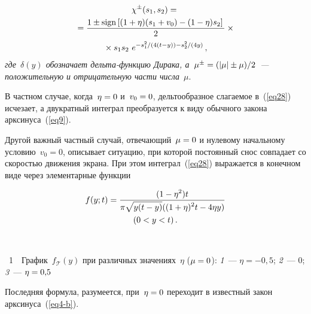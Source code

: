 \begin{multicols}{2}
\vspace*{-12pt}

\noindent
\begin{multline}
     \chi^\pm(s_1, s_2) ={}\\
      {}=\displaystyle\frac{\displaystyle 1 \pm \mathrm{sign}\left[(1 + \eta)(s_1+v_0)-(1 - \eta )s_2\right]\mathstrut}{\displaystyle 2\mathstrut}\times{}\\
      {}\times s_1 s_2\ e^{- {s_1^2}/(4(t-y)) -{s_2^2}/(4y)}\,,
    \label{eq28}
  \end{multline}
  \textit{где~$\delta(y)$ обозначает дель\-та-функ\-цию Дирака, а~$\mu^\pm \hm= (|\mu| \pm \mu)/2$~--- положительную и отрицательную части числа}~$\mu$.


\smallskip

В частном случае, когда~$\eta \hm= 0$ и~$v_0 \hm= 0$, дельтообразное слагаемое в~(\ref{eq28}) исчезает, а двукратный интеграл преобразуется к виду обычного закона арксинуса~(\ref{eq9}).

Другой важный частный случай, от\-ве\-ча\-ющий~$\mu \hm= 0$ и нулевому начальному условию~$v_0 = 0$, описывает ситуацию, при которой постоянный снос совпадает со скоростью движения экрана. При этом интеграл~(\ref{eq28}) выражается в конечном виде через элементарные функции

\noindent
\begin{multline*}
  f(y; t) = \displaystyle\frac{\displaystyle (1 - \eta ^2)t\mathstrut}{\displaystyle \pi  \sqrt{y (t - y)} ((1 + \eta)^2t -4 \eta y)\mathstrut} \\
  (0<y<t)\,.
\end{multline*}

\begin{center}  %
\vspace*{-1pt}
\mbox{%
 \epsfxsize=79.301mm
 }

\end{center}


\noindent
{{\figurename~1}\ \ \small{График~$f_{\mathcal{T}}(y)$ при различных значениях~$\eta$ ($\mu \hm= 0$): \textit{1}~--- $\eta=-0{,}5$; \textit{2}~--- 0; \textit{3}~--- $\eta\hm=0{,}5$}}



\vspace*{18pt}


\addtocounter{figure}{1}





\noindent
Последняя формула, разумеется, при~$\eta \hm= 0$ переходит в известный закон арксинуса~(\ref{eq4-b}).


\end{multicols}
